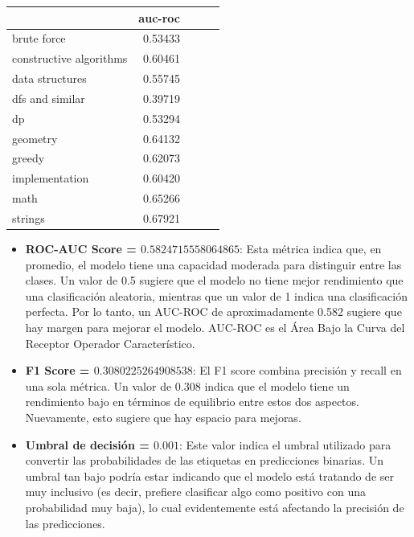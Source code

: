 \documentclass{article}
\begin{document}
\begin{tabular}{lrrrr}
    \toprule
    {}                      & auc-roc \\
    \midrule
    brute force             & 0.53433 \\
    constructive algorithms & 0.60461 \\
    data structures         & 0.55745 \\
    dfs and similar         & 0.39719 \\
    dp                      & 0.53294 \\
    geometry                & 0.64132 \\
    greedy                  & 0.62073 \\
    implementation          & 0.60420 \\
    math                    & 0.65266 \\
    strings                 & 0.67921 \\
    \bottomrule
\end{tabular}

\begin{itemize}
    \item \textbf{ROC-AUC Score = $0.5824715558064865$}: Esta métrica indica que, en promedio, el modelo tiene una
          capacidad moderada para distinguir entre las clases. Un valor de 0.5 sugiere que el modelo 
          no tiene mejor rendimiento que una clasificación aleatoria, mientras que un valor de 1 
          indica una clasificación perfecta. Por lo tanto, un AUC-ROC de aproximadamente 0.582 sugiere 
          que hay margen para mejorar el modelo. AUC-ROC  es el Área Bajo la Curva del Receptor Operador 
          Característico.
    \item \textbf{F1 Score = $0.3080225264908538$}: El F1 score combina precisión y recall en una
          sola métrica. Un valor de 0.308 indica que el modelo tiene un rendimiento bajo en términos de 
          equilibrio entre estos dos aspectos. Nuevamente, esto sugiere que hay espacio para mejoras.
    \item \textbf{Umbral de decisión = $0.001$}: Este valor indica el umbral utilizado para convertir las
          probabilidades de las etiquetas en predicciones binarias. Un umbral tan bajo podría estar 
          indicando que el modelo está tratando de ser muy inclusivo (es decir, prefiere clasificar 
          algo como positivo con una probabilidad muy baja), lo cual evidentemente está afectando la 
          precisión de las predicciones.
\end{itemize}
\end{document}
